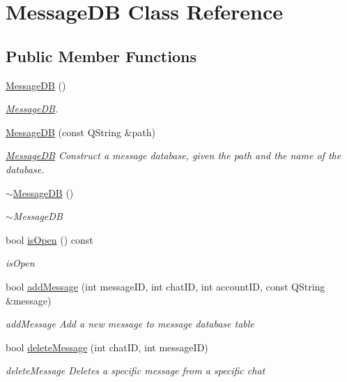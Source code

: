 \hypertarget{classMessageDB}{}\section{Message\+DB Class Reference}
\label{classMessageDB}
\subsection*{Public Member Functions}
\begin{DoxyCompactItemize}
\item 
\hyperlink{classMessageDB_a231aa735bc53856b529e7a90881e5dd6}{Message\+DB} ()
\begin{DoxyCompactList}\small\item\em \hyperlink{classMessageDB}{Message\+DB}. \end{DoxyCompactList}\item 
\hyperlink{classMessageDB_a15df8f0fe21a37291154ca3f41910b5f}{Message\+DB} (const Q\+String \&path)
\begin{DoxyCompactList}\small\item\em \hyperlink{classMessageDB}{Message\+DB} Construct a message database, given the path and the name of the database. \end{DoxyCompactList}\item 
\hyperlink{classMessageDB_a484178341bec1ced68a600c1ee63d592}{$\sim$\+Message\+DB} ()
\begin{DoxyCompactList}\small\item\em $\sim$\+Message\+DB \end{DoxyCompactList}\item 
bool \hyperlink{classMessageDB_a21821b985bc97bbc8d57ad6c83789b6b}{is\+Open} () const 
\begin{DoxyCompactList}\small\item\em is\+Open \end{DoxyCompactList}\item 
bool \hyperlink{classMessageDB_a863043c12bfebf091027f16fdbb04a27}{add\+Message} (int message\+ID, int chat\+ID, int account\+ID, const Q\+String \&message)
\begin{DoxyCompactList}\small\item\em add\+Message Add a new message to message database table \end{DoxyCompactList}\item 
bool \hyperlink{classMessageDB_acad7a46b4029c6066d29aba829edc673}{delete\+Message} (int chat\+ID, int message\+ID)
\begin{DoxyCompactList}\small\item\em delete\+Message Deletes a specific message from a specific chat \end{DoxyCompactList}\item 

\end{DoxyCompactItemize}
